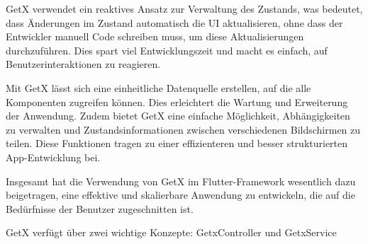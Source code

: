 GetX verwendet ein reaktives Ansatz zur Verwaltung des Zustands, was bedeutet, dass Änderungen im Zustand automatisch die UI aktualisieren, ohne dass der Entwickler manuell Code schreiben muss, um diese Aktualisierungen durchzuführen. Dies spart viel Entwicklungszeit und macht es einfach, auf Benutzerinteraktionen zu reagieren.

Mit GetX lässt sich eine einheitliche Datenquelle erstellen, auf die alle Komponenten zugreifen können. Dies erleichtert die Wartung und Erweiterung der Anwendung. Zudem bietet GetX eine einfache Möglichkeit, Abhängigkeiten zu verwalten und Zustandsinformationen zwischen verschiedenen Bildschirmen zu teilen. Diese Funktionen tragen zu einer effizienteren und besser strukturierten App-Entwicklung bei.

Insgesamt hat die Verwendung von GetX im Flutter-Framework wesentlich dazu beigetragen, eine effektive und skalierbare Anwendung zu entwickeln, die auf die Bedürfnisse der Benutzer zugeschnitten ist.



GetX verfügt über zwei wichtige Konzepte: GetxController und GetxService

